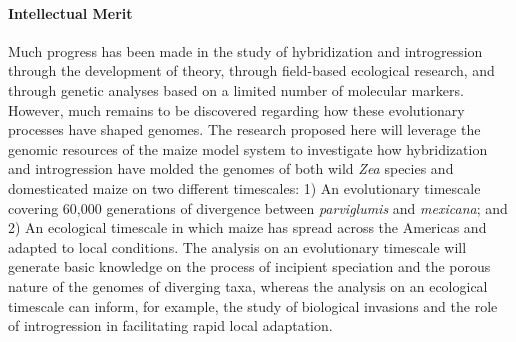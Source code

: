%

\paragraph{Intellectual Merit}  Much progress has been made in the study of hybridization and introgression through the development of theory, through field-based ecological research, and through genetic analyses based on a limited number of molecular markers. However, much remains to be discovered regarding how these evolutionary processes have shaped genomes. The research proposed here will leverage the genomic resources of the maize model system to investigate how hybridization and introgression have molded the genomes of both wild \emph{Zea} species and domesticated maize on two different timescales: 1) An evolutionary timescale covering 60,000 generations of divergence between \emph{parviglumis} and \emph{mexicana}; and 2) An ecological timescale in which maize has spread across the Americas and adapted to local conditions. The analysis on an evolutionary timescale will generate basic knowledge on the process of incipient speciation and the porous nature of the genomes of diverging taxa, whereas the analysis on an ecological timescale can inform, for example, the study of biological invasions and the role of introgression in facilitating rapid local adaptation.



